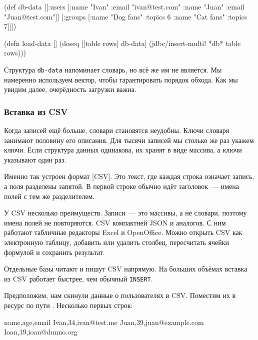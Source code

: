 \else

\begin{english}
  \begin{clojure}
(def db-data
  [[:users [{:name "Ivan" :email "ivan@test.com"}
            {:name "Juan" :email "Juan@test.com"}]]
   [:groups [{:name "Dog fans" :topics 6}
             {:name "Cat fans" :topics 7}]]])

(defn load-data []
  (doseq [[table rows] db-data]
    (jdbc/insert-multi! *db* table rows)))
  \end{clojure}
\end{english}

\fi

Структура \verb|db-data| напоминает словарь, но всё же им не является. Мы
намеренно используем вектор, чтобы гарантировать порядок обхода. Как мы увидим
далее, очерёдность загрузки важна.

\subsubsection*{Вставка из CSV}


Когда записей ещё больше, словари становятся неудобны. Ключи словаря занимают
половину его описания. Для тысячи записей мы столько же раз укажем ключи. Если
структура данных одинакова, их хранят в виде массива, а ключи указывают один
раз.

Именно так устроен формат [CSV].
Это текст, где каждая строка означает запись, а поля разделены запятой.
В первой строке обычно идёт заголовок~--- имена полей с тем же разделителем.

У CSV несколько преимуществ. Записи~--- это массивы, а не словари, поэтому имена
полей не повторяются. CSV компактней JSON и аналогов. С ним работают табличные
редакторы Excel и OpenOffice. Можно открыть CSV как электронную таблицу,
добавить или удалить столбец, пересчитать ячейки формулой и сохранить результат.


Отдельные базы читают и пишут CSV напрямую. На больших объёмах вставка из CSV
работает быстрее, чем обычный \verb|INSERT|.

Предположим, нам скинули данные о пользователях в CSV. Поместим их в ресурс по
пути . Несколько первых строк:

\begin{english}
  \begin{text}
name,age,email
Ivan,34,ivan@test.me
Juan,39,juan@example.com
Ioan,19,ioan@dunno.org
  \end{text}
\end{english}

